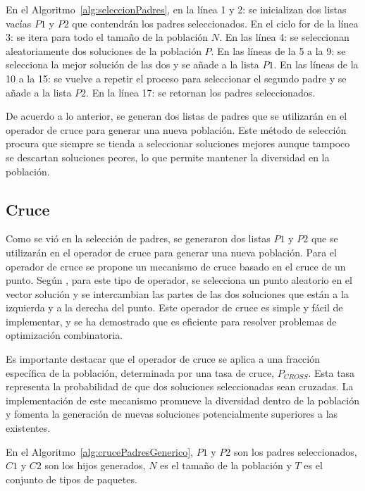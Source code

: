 En el Algoritmo~\ref{alg:seleccionPadres}, en la línea 1 y 2: se inicializan dos listas vacías $P1$ y $P2$ que contendrán los padres seleccionados. En el ciclo for de la línea 3: se itera para todo el tamaño de la población $N$. En las línea 4: se seleccionan aleatoriamente dos soluciones de la población $P$. En las líneas de la 5 a la 9: se selecciona la mejor solución de las dos y se añade a la lista $P1$. En las líneas de la 10 a la 15: se vuelve a repetir el proceso para seleccionar el segundo padre y se añade a la lista $P2$. En la línea 17: se retornan los padres seleccionados.

De acuerdo a lo anterior, se generan dos listas de padres que se utilizarán en el operador de cruce para generar una nueva población. Este método de selección procura que siempre se tienda a seleccionar soluciones mejores aunque tampoco se descartan soluciones peores, lo que permite mantener la diversidad en la población.

\subsection{Cruce}

Como se vió en la selección de padres, se generaron dos listas $P1$ y $P2$ que se utilizarán en el operador de cruce para generar una nueva población. Para el operador de cruce se propone un mecanismo de cruce basado en el cruce de un punto. Según \textcite{Umbarkar2015}, para este tipo de operador, se selecciona un punto aleatorio en el vector solución y se intercambian las partes de las dos soluciones que están a la izquierda y a la derecha del punto. Este operador de cruce es simple y fácil de implementar, y se ha demostrado que es eficiente para resolver problemas de optimización combinatoria.

Es importante destacar que el operador de cruce se aplica a una fracción específica de la población, determinada por una tasa de cruce, $P_{CROSS}$. Esta tasa representa la probabilidad de que dos soluciones seleccionadas sean cruzadas. La implementación de este mecanismo promueve la diversidad dentro de la población y fomenta la generación de nuevas soluciones potencialmente superiores a las existentes.

En el Algoritmo~\ref{alg:crucePadresGenerico}, $P1$ y $P2$ son los padres seleccionados, $C1$ y $C2$ son los hijos generados, $N$ es el tamaño de la población y $T$ es el conjunto de tipos de paquetes.

